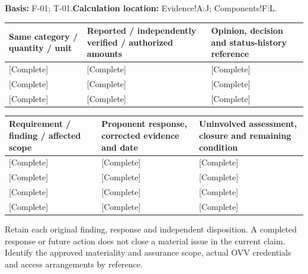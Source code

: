 \textbf{Basis:} F-01; T-01.\quad\textbf{Calculation location:} Evidence!A:J; Components!F:L.\par\endgroup
{\sffamily\fontsize{8.6}{10.7}\selectfont\begin{longtable}{@{}P{48mm}P{61mm}P{53mm}@{}}
\toprule
\textbf{Same category / quantity / unit} & \textbf{Reported / independently verified / authorized amounts} & \textbf{Opinion, decision and status-history reference}\\\midrule\endhead
\rule{0pt}{8mm}[Complete] & [Complete] & [Complete]\\\hline
\rule{0pt}{8mm}[Complete] & [Complete] & [Complete]\\\hline
\rule{0pt}{8mm}[Complete] & [Complete] & [Complete]\\\hline
\end{longtable}}
{\sffamily\fontsize{8.6}{10.7}\selectfont\begin{longtable}{@{}P{48mm}P{61mm}P{53mm}@{}}
\toprule
\textbf{Requirement / finding / affected scope} & \textbf{Proponent response, corrected evidence and date} & \textbf{Uninvolved assessment, closure and remaining condition}\\\midrule\endhead
\rule{0pt}{8mm}[Complete] & [Complete] & [Complete]\\\hline
\rule{0pt}{8mm}[Complete] & [Complete] & [Complete]\\\hline
\rule{0pt}{8mm}[Complete] & [Complete] & [Complete]\\\hline
\rule{0pt}{8mm}[Complete] & [Complete] & [Complete]\\\hline
\end{longtable}}
Retain each original finding, response and independent disposition. A completed response or future action does not close a material issue in the current claim. Identify the approved materiality and assurance scope, actual OVV credentials and access arrangements by reference.\par
{}
